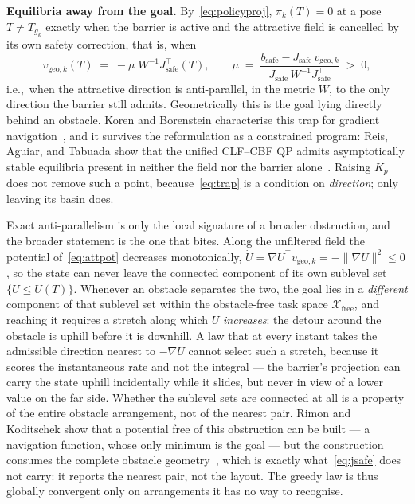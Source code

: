 \textbf{Equilibria away from the goal.} By~\eqref{eq:policyproj}, $\pi_k(T) = 0$ at a pose $T \neq T_{g_k}$ exactly when the barrier is active and the attractive field is cancelled by its own safety correction, that is, when
\begin{equation}
v_{\text{geo},k}(T) \;=\; -\mu\;W^{-1}J_{\text{safe}}^{\top}(T),
\qquad
\mu \;=\; \frac{b_{\text{safe}} - J_{\text{safe}}\,v_{\text{geo},k}}{J_{\text{safe}}\,W^{-1}J_{\text{safe}}^{\top}} \;>\; 0,
\label{eq:trap}
\end{equation}
i.e.,\ when the attractive direction is anti-parallel, in the metric $W$, to the only direction the barrier still admits. Geometrically this is the goal lying directly behind an obstacle. Koren and Borenstein characterise this trap for gradient navigation~\cite{koren1991potential}, and it survives the reformulation as a constrained program: Reis, Aguiar, and Tabuada show that the unified CLF--CBF QP admits asymptotically stable equilibria present in neither the field nor the barrier alone~\cite{reis2021undesirable}. Raising $K_p$ does not remove such a point, because~\eqref{eq:trap} is a condition on \emph{direction}; only leaving its basin does.

Exact anti-parallelism is only the local signature of a broader obstruction, and the broader statement is the one that bites. Along the unfiltered field the potential of~\eqref{eq:attpot} decreases monotonically, $\dot{U} = \nabla U^{\top}v_{\text{geo},k} = -\lVert\nabla U\rVert^{2} \le 0$, so the state can never leave the connected component of its own sublevel set $\{U \le U(T)\}$. Whenever an obstacle separates the two, the goal lies in a \emph{different} component of that sublevel set within the obstacle-free task space $\mathcal{X}_{\text{free}}$, and reaching it requires a stretch along which $U$ \emph{increases}: the detour around the obstacle is uphill before it is downhill. A law that at every instant takes the admissible direction nearest to $-\nabla U$ cannot select such a stretch, because it scores the instantaneous rate and not the integral --- the barrier's projection can carry the state uphill incidentally while it slides, but never in view of a lower value on the far side. Whether the sublevel sets are connected at all is a property of the entire obstacle arrangement, not of the nearest pair. Rimon and Koditschek show that a potential free of this obstruction can be built --- a navigation function, whose only minimum is the goal --- but the construction consumes the complete obstacle geometry~\cite{rimon1992exact}, which is exactly what~\eqref{eq:jsafe} does not carry: it reports the nearest pair, not the layout. The greedy law is thus globally convergent only on arrangements it has no way to recognise.

